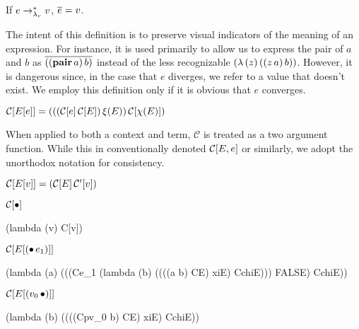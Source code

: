\begin{definition}
If $e\rightarrow_{\lambda_v}^{*} v$, $\overline{e}=v$.

The intent of this definition is to preserve visual indicators of the meaning of an
expression. For instance, it is used primarily to allow us to express the pair of $a$ and
$b$ as $\overline{((\mathbf{pair}\,a)\,b)}$ instead of the less recognizable
$(\lambda\,(z)\,((z\,a)\,b))$. However, it is dangerous since, in the case that $e$
diverges, we refer to a value that doesn't exist. We employ this definition only if it is
obvious that $e$ converges.
\end{definition}

\begin{definition}
$\mathcal{C}[E[e]]=(((\mathcal{C}[e]\,\mathcal{C}[E])\,\xi(E))\,\mathcal{C}[\chi(E)])$

When applied to both a context and term, $\mathcal{C}$ is treated as a two argument
function. While this in conventionally denoted $\mathcal{C}[E,e]$ or similarly, we adopt the
unorthodox notation for consistency.
\end{definition}

\begin{definition}
$\mathcal{C}[E[v]]=(\mathcal{C}[E]\,\mathcal{C}'[v])$
\end{definition}

\begin{schemedefinition}{$\mathcal{C}[\bullet]$}
\begin{schemeblock}
\begin{schemedisplay}
(lambda (v) C[v])
\end{schemedisplay}
\end{schemeblock}
\end{schemedefinition}

\begin{schemedefinition}{$\mathcal{C}[E[(\bullet\,e_1)]]$}
\begin{schemeblock}
\begin{schemedisplay}
(lambda (a)
  (((Ce_1
     (lambda (b)
       ((((a b) CE) xiE) CchiE)))
    FALSE)
   CchiE))
\end{schemedisplay}
\end{schemeblock}
\end{schemedefinition}

\begin{schemedefinition}{$\mathcal{C}[E[(v_0\,\bullet)]]$}
\begin{schemeblock}
\begin{schemedisplay}
(lambda (b) ((((Cpv_0 b) CE) xiE) CchiE))
\end{schemedisplay}
\end{schemeblock}
\end{schemedefinition}

